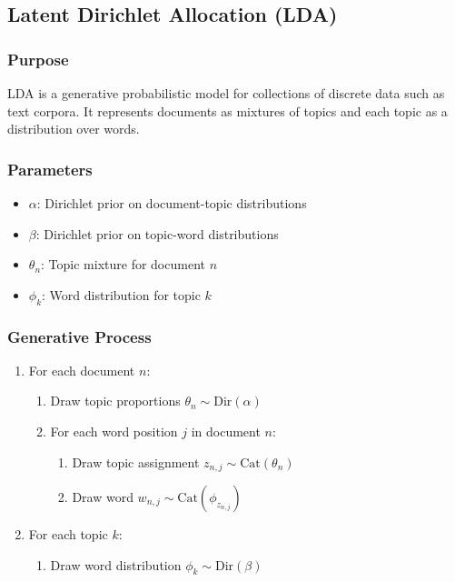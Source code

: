 \documentclass{article}
\begin{document}
\subsection{Latent Dirichlet Allocation (LDA)}

\subsubsection{Purpose}
LDA is a generative probabilistic model for collections of discrete data such as text corpora. It represents documents as mixtures of topics and each topic as a distribution over words.

\subsubsection{Parameters}
\begin{itemize}
    \item $\alpha$: Dirichlet prior on document-topic distributions
    \item $\beta$: Dirichlet prior on topic-word distributions
    \item $\theta_n$: Topic mixture for document $n$
    \item $\phi_k$: Word distribution for topic $k$
\end{itemize}

\subsubsection{Generative Process}
\begin{enumerate}
    \item For each document $n$:
    \begin{enumerate}
        \item Draw topic proportions $\theta_n \sim \text{Dir}(\alpha)$
        \item For each word position $j$ in document $n$:
        \begin{enumerate}
            \item Draw topic assignment $z_{n,j} \sim \text{Cat}(\theta_n)$
            \item Draw word $w_{n,j} \sim \text{Cat}(\phi_{z_{n,j}})$
        \end{enumerate}
    \end{enumerate}
    \item For each topic $k$:
    \begin{enumerate}
        \item Draw word distribution $\phi_k \sim \text{Dir}(\beta)$
    \end{enumerate}
\end{enumerate}
\end{document}
